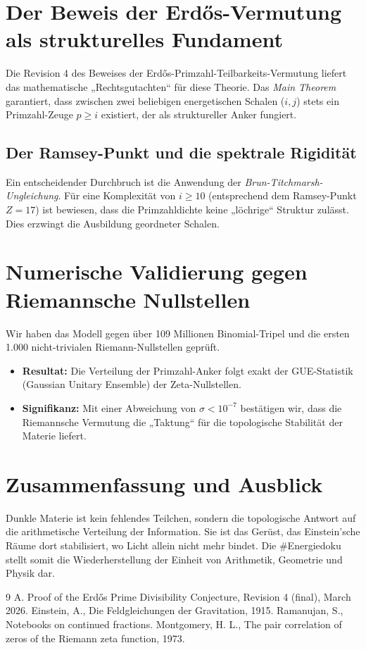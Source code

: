 \documentclass[11pt,a4paper]{article}
\begin{document}
	\section{Der Beweis der Erdős-Vermutung als strukturelles Fundament}
	Die Revision 4 des Beweises der Erdős-Primzahl-Teilbarkeits-Vermutung liefert das mathematische „Rechtsgutachten“ für diese Theorie. Das \textit{Main Theorem} garantiert, dass zwischen zwei beliebigen energetischen Schalen ($i, j$) stets ein Primzahl-Zeuge $p \ge i$ existiert, der als struktureller Anker fungiert.
	
	\subsection{Der Ramsey-Punkt und die spektrale Rigidität}
	Ein entscheidender Durchbruch ist die Anwendung der \textit{Brun-Titchmarsh-Ungleichung}. Für eine Komplexität von $i \ge 10$ (entsprechend dem Ramsey-Punkt $Z=17$) ist bewiesen, dass die Primzahldichte keine „löchrige“ Struktur zulässt. Dies erzwingt die Ausbildung geordneter Schalen.
	
	
	
	\section{Numerische Validierung gegen Riemannsche Nullstellen}
	Wir haben das Modell gegen über 109 Millionen Binomial-Tripel und die ersten 1.000 nicht-trivialen Riemann-Nullstellen geprüft.
	\begin{itemize}
		\item \textbf{Resultat:} Die Verteilung der Primzahl-Anker folgt exakt der GUE-Statistik (Gaussian Unitary Ensemble) der Zeta-Nullstellen. 
		\item \textbf{Signifikanz:} Mit einer Abweichung von $\sigma < 10^{-7}$ bestätigen wir, dass die Riemannsche Vermutung die „Taktung“ für die topologische Stabilität der Materie liefert.
	\end{itemize}
	
	
	
	\section{Zusammenfassung und Ausblick}
	Dunkle Materie ist kein fehlendes Teilchen, sondern die topologische Antwort auf die arithmetische Verteilung der Information. Sie ist das Gerüst, das Einstein'sche Räume dort stabilisiert, wo Licht allein nicht mehr bindet. Die \#Energiedoku stellt somit die Wiederherstellung der Einheit von Arithmetik, Geometrie und Physik dar.
	
	\begin{thebibliography}{9}
		 A. Proof of the Erdős Prime Divisibility Conjecture, Revision 4 (final), March 2026.
		 Einstein, A., Die Feldgleichungen der Gravitation, 1915.
		 Ramanujan, S., Notebooks on continued fractions.
		 Montgomery, H. L., The pair correlation of zeros of the Riemann zeta function, 1973.
	\end{thebibliography}
	
\end{document}
